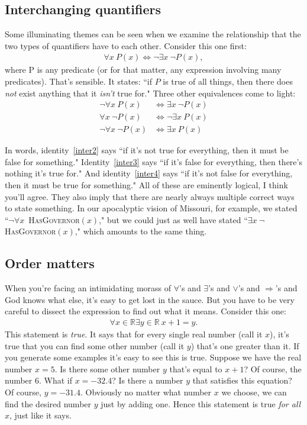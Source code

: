 \subsection{Interchanging quantifiers}

Some illuminating themes can be seen when we examine the relationship that
the two types of quantifiers have to each other. Consider this one first:
\begin{align}
\forall x \ P(x) \Leftrightarrow \neg \exists x\ \neg P(x), \label{inter1}
\end{align}
where P is any predicate (or for that matter, any expression involving many
predicates). That's sensible. It states: ``if $P$ is true of all things,
then there does \textit{not} exist anything that it \textit{isn't} true
for." Three other equivalences come to light:
\begin{align}
\neg \forall x \ P(x) & \Leftrightarrow \exists x\ \neg P(x)    \label{inter2}\\
     \forall x \ \neg P(x) & \Leftrightarrow \neg \exists x\ P(x)
\label{inter3}\\
\neg \forall x \ \neg P(x) & \Leftrightarrow \exists x\ P(x)
\label{inter4}
\end{align}

In words, identity~\ref{inter2} says ``if it's not true for everything,
then it must be false for something." Identity~\ref{inter3} says ``if it's
false for everything, then there's nothing it's true for." And
identity~\ref{inter4} says ``if it's not false for everything, then it must
be true for something." All of these are eminently logical, I think you'll
agree. They also imply that there are nearly always multiple correct ways
to state something. In our apocalyptic vision of Missouri, for example, we
stated ``$\neg \forall x$\ \textsc{HasGovernor}$(x)$," but we could just as
well have stated ``$\exists x\ \neg$\textsc{HasGovernor}$(x)$," which
amounts to the same thing.

\subsection{Order matters}

When you're facing an intimidating morass of $\forall$'s and $\exists$'s
and $\vee$'s and $\Rightarrow$'s and God knows what else, it's easy to get
lost in the sauce. But you have to be very careful to dissect the
expression to find out what it means. Consider this one:
\begin{align}
\forall x \in \mathbb{R} \exists y \in \mathbb{R} \ x+1=y.
\end{align}
This statement is \textit{true}. It says that for every single real number
(call it $x$), it's true that you can find some other number (call it $y$)
that's one greater than it. If you generate some examples it's easy to see
this is true. Suppose we have the real number $x=5$. Is there some other
number $y$ that's equal to $x+1$? Of course, the number 6. What if
$x=-32.4$? Is there a number $y$ that satisfies this equation? Of course,
$y=-31.4$. Obviously no matter what number $x$ we choose, we can find the
desired number $y$ just by adding one. Hence this statement is true
\textit{for all} $x$, just like it says.

